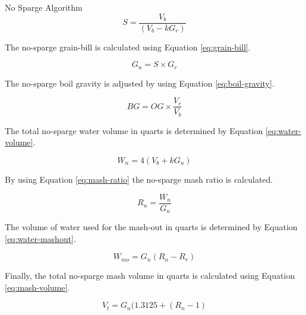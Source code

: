 \documentclass[final]{beamer}
\newlength{\onecolwid}
\begin{document}
\begin{frame}[t]
\begin{columns}[t]
\begin{column}{\onecolwid}
\begin{block}{No Sparge Algorithm}
\begin{equation}
S = \frac{V_{b}}{(V_{b} - kG_{r})}
\label{eq:scale-up}
\end{equation}

\noindent The no-sparge grain-bill is calculated using Equation \ref{eq:grain-bill}.

\begin{equation}
G_{n} = S \times G_{r}
\label{eq:grain-bill}
\end{equation}

\noindent The no-sparge boil gravity is adjusted by using Equation \ref{eq:boil-gravity}.

\begin{equation}
BG = OG \times \frac{V_{r}}{V_{b}}
\label{eq:boil-gravity}
\end{equation}

\noindent The total no-sparge water volume in quarts is determined by Equation \ref{eq:water-volume}.

\begin{equation}
W_{n} = 4(V_{b} + kG_{n})
\label{eq:water-volume}
\end{equation}

\noindent By using Equation \ref{eq:mash-ratio} the no-sparge mash ratio is calculated.

\begin{equation}
R_{n} = \frac{W_{n}}{G_{n}}
\label{eq:mash-ratio}
\end{equation}

\noindent The volume of water used for the mash-out in quarts is determined by Equation \ref{eq:water-mashout}.

\begin{equation}
W_{mo} = G_{n}(R_{n} - R_{r})
\label{eq:water-mashout}
\end{equation}

\noindent Finally, the total no-sparge mash volume in quarts is calculated using Equation \ref{eq:mash-volume}.

\begin{equation}
V_{t} = G_{n}(1.3125 + (R_{n} - 1)
\label{eq:mash-volume}
\end{equation}

\end{block}



\end{column}
\end{columns}
\end{frame}
\end{document}
